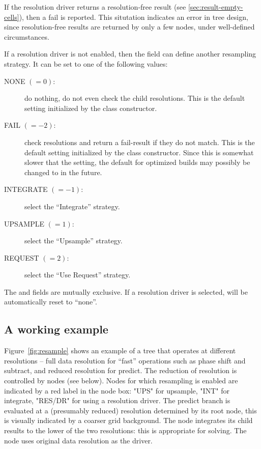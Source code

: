   If the resolution driver returns a resolution-free result (see
  \ref{sec:result-empty-cells}), then a fail is reported. This situtation
  indicates an error in tree design, since resolution-free results are returned
  by only a few nodes, under well-defined circumstances.
  
  If a resolution driver is not enabled, then the  field can
  define another resampling strategy. It can be set to one of the following
  values:

  \begin{description}

  \item[NONE $(=0)$:] do nothing, do not even check the child resolutions. This
  is the default setting initialized by the  class constructor. 

  \item[FAIL $(=-2)$:] check resolutions and return a fail-result if they do
  not match. This is the default setting initialized by the  class
  constructor. Since this is somewhat slower that the  setting, the
  default for optimized builds may possibly be changed to  in the
  future.

  \item[INTEGRATE $(=-1)$:] select the ``Integrate'' strategy.

  \item[UPSAMPLE $(=1)$:] select the ``Upsample'' strategy.

  \item[REQUEST $(=2)$:] select the ``Use Request'' strategy.

  \end{description}
  
  The  and  fields are mutually
  exclusive. If a resolution driver is selected,  will be
  automatically reset to ``none''.
  
\subsection{A working example}

  Figure~\ref{fig:resample} shows an example of a tree that operates at 
  different resolutions -- full data resolution for ``fast'' operations such as
  phase shift and subtract, and reduced resolution for predict. The reduction of
  resolution is controlled by  nodes (see below).
  Nodes for which resampling is enabled are indicated by a red label in the
  node box: "UPS" for upsample, "INT" for integrate, "RES/DR" for using a
  resolution driver. The predict branch is evaluated at a (presumably reduced)
  resolution determined by its root  node, this is visually
  indicated by a coarser grid background. The  node integrates its
  child results to the lower of the two resolutions: this is appropriate for
  solving. The  node uses original data resolution as the driver.

